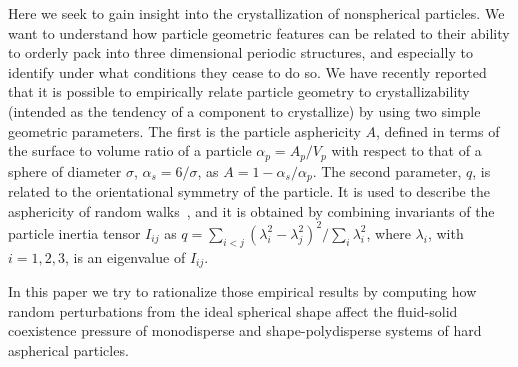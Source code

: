 {Here we seek to gain insight into the crystallization of nonspherical particles. 
 We want to understand how  particle geometric features can be related to their ability to orderly pack into three dimensional periodic structures,
 and especially  to identify under what conditions they cease to do so. 
 We have recently reported~\cite{disorder1}  that it is possible to empirically relate particle geometry to crystallizability (intended as the tendency of a component to crystallize) 
by using two simple geometric parameters. The first is the particle asphericity  $A$, defined in terms of the 
surface to volume ratio of a particle $\alpha_p=A_p/V_p$ with respect to that of a sphere of diameter $\sigma$, $\alpha_s=6/\sigma$, as
$A =1-\alpha_s/\alpha_p.$  The second parameter, $q$, is related to the  orientational symmetry  of the particle.
It is used to describe the  asphericity of random walks~\cite{rudnick}, and it is obtained by combining invariants of the particle inertia tensor $I_{ij}$  as
$q=\sum_{i< j} (\lambda_i^2-\lambda_j^2)^2/\sum_i \lambda_i^2$, where $\lambda_i$, with $i=1, 2, 3$, is an eigenvalue of $I_{ij}$.
 
In this paper we try to rationalize those empirical results by computing how random perturbations from the ideal spherical 
shape affect the fluid-solid coexistence pressure of  monodisperse and shape-polydisperse systems of hard aspherical particles.

}
